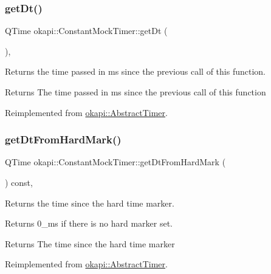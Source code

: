\subsubsection{\texorpdfstring{getDt()}{getDt()}}
{\footnotesize\ttfamily Q\+Time okapi\+::\+Constant\+Mock\+Timer\+::get\+Dt (\begin{DoxyParamCaption}{ }\end{DoxyParamCaption})\hspace{0.3cm}{\ttfamily [override]}, {\ttfamily [virtual]}}



Returns the time passed in ms since the previous call of this function. 

\begin{DoxyReturn}{Returns}
The time passed in ms since the previous call of this function 
\end{DoxyReturn}


Reimplemented from \mbox{\hyperlink{classokapi_1_1AbstractTimer_a6c79c35780dbc4e04e356167bb175424}{okapi\+::\+Abstract\+Timer}}.

\mbox{\label{classokapi_1_1ConstantMockTimer_a9811ae0da08a9f63011ba3226fd65043}} 
\subsubsection{\texorpdfstring{getDtFromHardMark()}{getDtFromHardMark()}}
{\footnotesize\ttfamily Q\+Time okapi\+::\+Constant\+Mock\+Timer\+::get\+Dt\+From\+Hard\+Mark (\begin{DoxyParamCaption}{ }\end{DoxyParamCaption}) const\hspace{0.3cm}{\ttfamily [override]}, {\ttfamily [virtual]}}



Returns the time since the hard time marker. 

Returns 0\+\_\+ms if there is no hard marker set.

\begin{DoxyReturn}{Returns}
The time since the hard time marker 
\end{DoxyReturn}


Reimplemented from \mbox{\hyperlink{classokapi_1_1AbstractTimer_ae32d95df73d640f248f987757163a164}{okapi\+::\+Abstract\+Timer}}.


